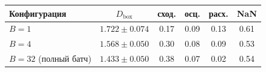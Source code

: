 \begin{tabular}{lccccc}
\toprule
Конфигурация & $D_{\mathrm{box}}$ & сход. & осц. & расх. & NaN\\
\midrule
$B=1$ & $1.722 \pm 0.074$ & 0.17 & 0.09 & 0.13 & 0.61\\
$B=4$ & $1.568 \pm 0.050$ & 0.30 & 0.08 & 0.09 & 0.53\\
$B=32$ (полный батч) & $1.433 \pm 0.050$ & 0.38 & 0.07 & 0.02 & 0.54\\
\bottomrule
\end{tabular}
